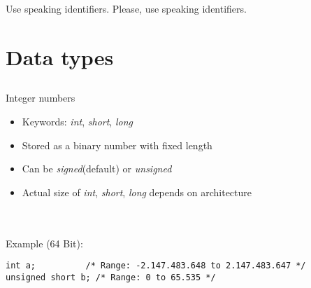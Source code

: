 \begin{frame}{Use speaking identifiers.}
	\LARGE
	\centering
	Please, use speaking identifiers.\footnotemark
	
\end{frame}

\section{Data types}
\subsection{}
\begin{frame}[fragile]{Integer numbers}
	\begin{itemize}
		\item Keywords: \textit{int}, \textit{short}, \textit{long}
		\item Stored as a binary number with fixed length
		\item Can be \textit{signed}(default) or \textit{unsigned}
		\item Actual size of \textit{int}, \textit{short}, \textit{long} depends on architecture
	\end{itemize}\ \\
	\ \\
	Example (64 Bit):
	\begin{lstlisting}[numbers=none]
int a;          /* Range: -2.147.483.648 to 2.147.483.647 */
unsigned short b; /* Range: 0 to 65.535 */
\end{lstlisting}
\end{frame}

